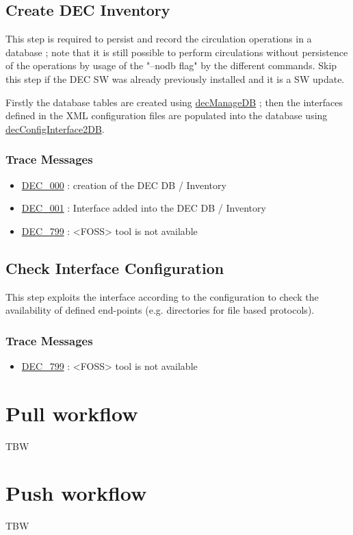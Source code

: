 \documentclass[dec_sum_main.tex]{subfiles}
\begin{document}
\subsection{Create DEC Inventory}
This step is required to persist and record the circulation operations in a database ; note that it is still possible to perform circulations without persistence of the operations by usage of the "--nodb flag" by the different commands. Skip this step if the DEC SW was already previously installed and it is a SW update.\newline

\par 
\noindent
Firstly the database tables are created using \hyperref[decManageDB]{decManageDB} ; then the interfaces defined in the XML configuration files are populated into the database using \hyperref[decConfigInterface2DB]{decConfigInterface2DB}.

\subsubsection{Trace Messages}

\begin{itemize}
    \item \hyperref[DEC000]{DEC\_000} : creation of the DEC DB / Inventory
    \item \hyperref[DEC001]{DEC\_001} : Interface added into the DEC DB / Inventory
    \item \hyperref[DEC799]{DEC\_799} : <FOSS> tool is not available
\end{itemize}

\subsection{Check Interface Configuration}
This step exploits the interface according to the configuration to check the availability of defined end-points (e.g. directories for file based protocols).

\subsubsection{Trace Messages}

\begin{itemize}
    \item \hyperref[DEC799]{DEC\_799} : <FOSS> tool is not available 
\end{itemize}

\section{Pull workflow}
TBW

\section{Push workflow}
TBW
\end{document}
